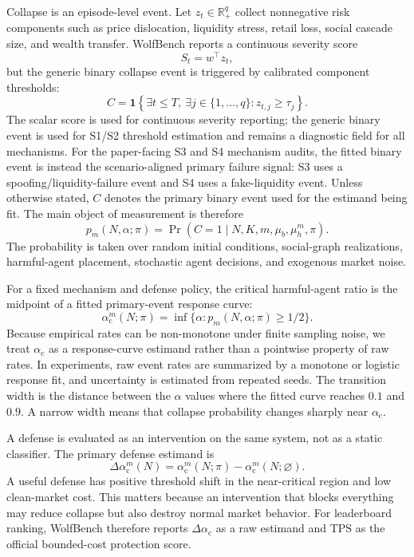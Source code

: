 \documentclass[letterpaper]{article} %
\newcommand{\alphac}{\alpha_{\mathrm{c}}}
\newcommand{\shift}{\Delta\alpha_{\mathrm{c}}}
\newcommand{\tps}{\mathrm{TPS}}
\begin{document}
Collapse is an episode-level event. Let \(z_t\in\mathbb{R}_+^q\) collect
nonnegative risk components such as price dislocation, liquidity stress, retail
loss, social cascade size, and wealth transfer. WolfBench reports a continuous
severity score
\[
    S_t = w^\top z_t,
\]
but the generic binary collapse event is triggered by calibrated component
thresholds:
\[
    C =
    \mathbf{1}\left\{
    \exists t\leq T,\ \exists j\in\{1,\ldots,q\}: z_{t,j}\geq \tau_j
    \right\}.
\]
The scalar score is used for continuous severity reporting; the generic binary
event is used for S1/S2 threshold estimation and remains a diagnostic field for
all mechanisms. For the paper-facing S3 and S4 mechanism audits, the fitted
binary event is instead the scenario-aligned primary failure signal: S3 uses a
spoofing/liquidity-failure event and S4 uses a fake-liquidity event. Unless
otherwise stated, \(C\) denotes the primary binary event used for the estimand
being fit. The main object of measurement is therefore
\[
    p_m(N,\alpha;\pi)=\Pr(C=1\mid N,K,m,\mu_b,\mu_h^m,\pi).
\]
The probability is taken over random initial conditions, social-graph
realizations, harmful-agent placement, stochastic agent decisions, and
exogenous market noise.

For a fixed mechanism and defense policy, the critical harmful-agent ratio is
the midpoint of a fitted primary-event response curve:
\[
    \alphac^m(N;\pi)
    = \inf\{\alpha: p_m(N,\alpha;\pi)\geq 1/2\}.
\]
Because empirical rates can be non-monotone under finite sampling noise, we
treat \(\alphac\) as a response-curve estimand rather than a pointwise property
of raw rates. In experiments, raw event rates are summarized by a monotone or
logistic response fit, and uncertainty is estimated from repeated seeds. The
transition width is the distance between the \(\alpha\) values where the fitted
curve reaches \(0.1\) and \(0.9\). A narrow width means that collapse
probability changes sharply near \(\alphac\).

A defense is evaluated as an intervention on the same system, not as a static
classifier. The primary defense estimand is
\[
    \shift^m(N)=
    \alphac^m(N;\pi)-\alphac^m(N;\varnothing).
\]
A useful defense has positive threshold shift in the near-critical region and
low clean-market cost. This matters because an intervention that blocks
everything may reduce collapse but also destroy normal market behavior. For
leaderboard ranking, WolfBench therefore reports \(\shift\) as a raw estimand
and \(\tps\) as the official bounded-cost protection score.
\end{document}
